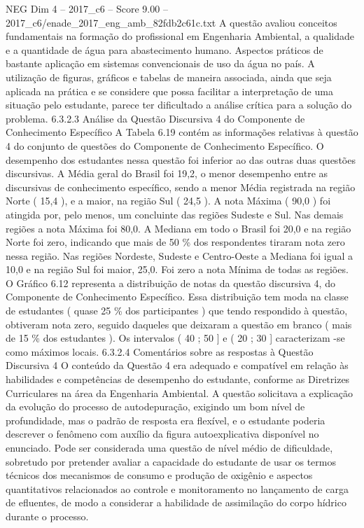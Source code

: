 \begin{textsample}{NEG Dim 4 – 2017\_c6 – Score 9.00 – 2017\_c6/enade\_2017\_eng\_amb\_82fdb2c61c.txt}
A questão avaliou conceitos fundamentais na formação do profissional em Engenharia Ambiental, a qualidade e a quantidade de água para abastecimento humano.
Aspectos práticos de bastante aplicação em sistemas convencionais de uso da água no país.
A utilização de figuras, gráficos e tabelas de maneira associada, ainda que seja aplicada na prática e se considere que possa facilitar a interpretação de uma situação pelo estudante, parece ter dificultado a análise crítica para a solução do problema. 6.3.2.3 Análise da Questão Discursiva 4 do Componente de Conhecimento Específico A Tabela 6.19 contém as informações relativas à questão 4 do conjunto de questões do Componente de Conhecimento Específico.
O desempenho dos estudantes nessa questão foi inferior ao das outras duas questões discursivas.
A Média geral do Brasil foi 19,2, o menor desempenho entre as discursivas de conhecimento específico, sendo a menor Média registrada na região Norte ( 15,4 ), e a maior, na região Sul ( 24,5 ).
A nota Máxima ( 90,0 ) foi atingida por, pelo menos, um concluinte das regiões Sudeste e Sul.
Nas demais regiões a nota Máxima foi 80,0.
A Mediana em todo o Brasil foi 20,0 e na região Norte foi zero, indicando que mais de 50 \% dos respondentes tiraram nota zero nessa região.
Nas regiões Nordeste, Sudeste e Centro-Oeste a Mediana foi igual a 10,0 e na região Sul foi maior, 25,0.
Foi zero a nota Mínima de todas as regiões.
O Gráfico 6.12 representa a distribuição de notas da questão discursiva 4, do Componente de Conhecimento Específico.
Essa distribuição tem moda na classe de estudantes ( quase 25 \% dos participantes ) que tendo respondido à questão, obtiveram nota zero, seguido daqueles que deixaram a questão em branco ( mais de 15 \% dos estudantes ).
Os intervalos ( 40 ; 50 ] e ( 20 ; 30 ] caracterizam -se como máximos locais. 6.3.2.4 Comentários sobre as respostas à Questão Discursiva 4 O conteúdo da Questão 4 era adequado e compatível em relação às habilidades e competências de desempenho do estudante, conforme as Diretrizes Curriculares na área da Engenharia Ambiental.
A questão solicitava a explicação da evolução do processo de autodepuração, exigindo um bom nível de profundidade, mas o padrão de resposta era flexível, e o estudante poderia descrever o fenômeno com auxílio da figura autoexplicativa disponível no enunciado.
Pode ser considerada uma questão de nível médio de dificuldade, sobretudo por pretender avaliar a capacidade do estudante de usar os termos técnicos dos mecanismos de consumo e produção de oxigênio e aspectos quantitativos relacionados ao controle e monitoramento no lançamento de carga de efluentes, de modo a considerar a habilidade de assimilação do corpo hídrico durante o processo.

\end{textsample}
